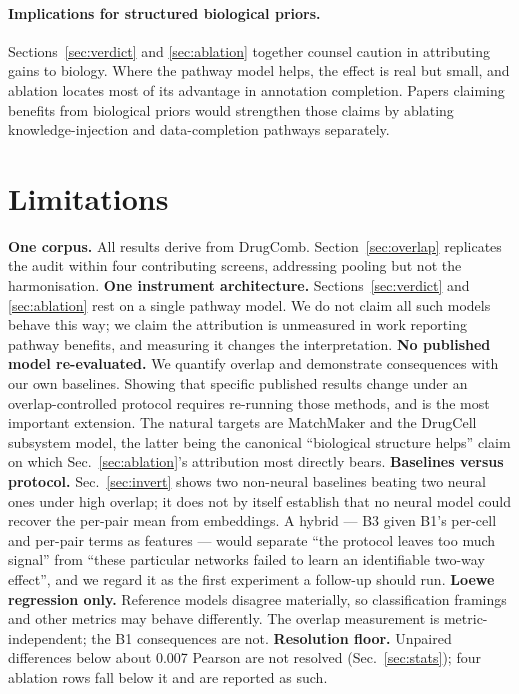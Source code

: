 \documentclass{ws-procs11x85}
\begin{document}
\paragraph{Implications for structured biological priors.}
Sections~\ref{sec:verdict} and \ref{sec:ablation} together counsel caution in
attributing gains to biology. Where the pathway model helps, the effect is real
but small, and ablation locates most of its advantage in annotation completion.
Papers claiming benefits from biological priors would strengthen those claims by
ablating knowledge-injection and data-completion pathways separately.

\section{Limitations}\label{sec:limits}

\textbf{One corpus.} All results derive from DrugComb.
Section~\ref{sec:overlap} replicates the audit within four contributing screens,
addressing pooling but not the harmonisation.
\textbf{One instrument architecture.} Sections~\ref{sec:verdict} and
\ref{sec:ablation} rest on a single pathway model. We do not claim all such
models behave this way; we claim the attribution is unmeasured in work reporting
pathway benefits, and measuring it changes the interpretation.
\textbf{No published model re-evaluated.} We quantify overlap and demonstrate
consequences with our own baselines. Showing that specific published results
change under an overlap-controlled protocol requires re-running those methods,
and is the most important extension. The natural targets are
MatchMaker\cite{kuru2022} and the DrugCell subsystem model,\cite{kuenzi2020} the
latter being the canonical ``biological structure helps'' claim on which
Sec.~\ref{sec:ablation}'s attribution most directly bears.
\textbf{Baselines versus protocol.} Sec.~\ref{sec:invert} shows two non-neural
baselines beating two neural ones under high overlap; it does not by itself
establish that no neural model could recover the per-pair mean from embeddings. A
hybrid --- B3 given B1's per-cell and per-pair terms as features --- would
separate ``the protocol leaves too much signal'' from ``these particular networks
failed to learn an identifiable two-way effect'', and we regard it as the first
experiment a follow-up should run.
\textbf{Loewe regression only.} Reference models disagree
materially,\cite{vlot2019,duarte2022,fuentealba2023} so classification framings
and other metrics may behave differently. The overlap measurement is
metric-independent; the B1 consequences are not.
\textbf{Resolution floor.} Unpaired differences below about 0.007 Pearson are not
resolved (Sec.~\ref{sec:stats}); four ablation rows fall below it and are
reported as such.
\end{document}
